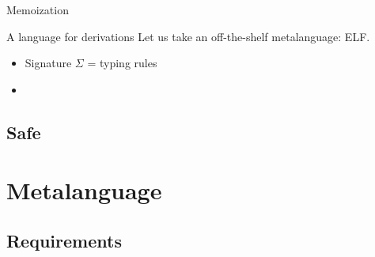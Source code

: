 \documentclass{beamer}
\begin{document}
\begin{frame}[fragile]{Memoization}
\begin{overlayarea}{\textwidth}{14em}
  \end{overlayarea}
\end{frame}

\begin{frame}{A language for derivations}
  Let us take an off-the-shelf metalanguage: ELF.
  \begin{itemize}
  \item Signature $\Sigma$ = typing rules
  \item
  \end{itemize}
\end{frame}

\begin{frame}{}
  
\end{frame}
\subsection{Safe}


\section{Metalanguage}

\subsection{Requirements}

\subsection{}
\end{document}
